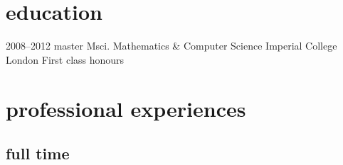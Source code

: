 \documentclass[]{friggeri-cv} %
\begin{document}

\section{education}

\begin{entrylist}

\entry
{2008--2012}
{master {\normalfont Msci. Mathematics \& Computer Science}}
{Imperial College London}
{First class honours}


\end{entrylist}


\section{professional experiences}

\subsection{full time}
\end{document}
